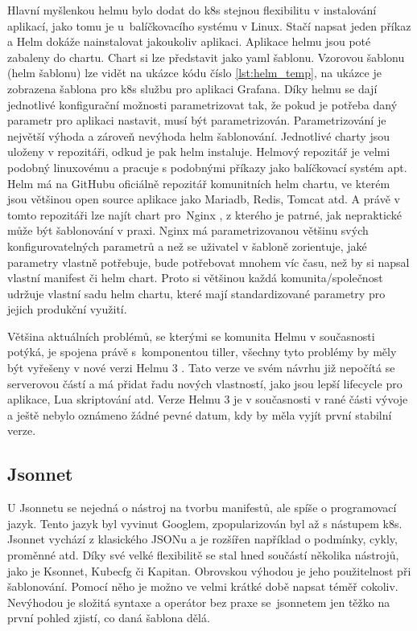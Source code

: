 Hlavní myšlenkou helmu bylo dodat do k8s stejnou flexibilitu v instalování aplikací, jako tomu je u balíčkovacího systému v Linux. Stačí napsat jeden příkaz a Helm dokáže nainstalovat jakoukoliv aplikaci. Aplikace helmu jsou poté zabaleny do chartu. Chart si lze představit jako yaml šablonu. Vzorovou šablonu (helm šablonu) lze vidět na ukázce kódu číslo \ref{lst:helm_temp}, na ukázce je zobrazena šablona pro k8s službu pro aplikaci Grafana. Díky helmu se dají jednotlivé konfigurační možnosti parametrizovat tak, že pokud je potřeba daný parametr pro aplikaci nastavit, musí být parametrizován. Parametrizování je největší výhoda a zároveň nevýhoda helm šablonování. Jednotlivé charty jsou uloženy v repozitáři, odkud je pak helm instaluje. Helmový repozitář je velmi podobný linuxovému a pracuje s podobnými příkazy jako balíčkovací systém apt. Helm má na GitHubu oficiálně repozitář komunitních helm chartu, ve kterém jsou většinou open source aplikace jako Mariadb, Redis, Tomcat atd. A právě v tomto repozitáři lze najít chart pro Nginx \cite{nginx_helm_template}, z kterého je patrné, jak nepraktické může být šablonování v praxi. Nginx má parametrizovanou většinu svých konfigurovatelných parametrů a než se uživatel v šabloně zorientuje, jaké parametry vlastně potřebuje, bude potřebovat mnohem víc času, než by si napsal vlastní manifest či helm chart. Proto si většinou každá komunita/společnost udržuje vlastní sadu helm chartu, které mají standardizované parametry pro jejich produkční využití.

Většina aktuálních problémů, se kterými se komunita Helmu v současnosti potýká, je spojena právě s komponentou tiller, všechny tyto problémy by měly být vyřešeny v nové verzi Helmu 3 \cite{helm_helm3}. Tato verze ve svém návrhu již nepočítá se serverovou částí a má přidat řadu nových vlastností, jako jsou lepší lifecycle pro aplikace, Lua skriptování atd. Verze Helmu 3 je v současnosti v rané části vývoje a ještě nebylo oznámeno žádné pevné datum, kdy by měla vyjít první stabilní verze.

\subsection{Jsonnet}
U Jsonnetu se nejedná o nástroj na tvorbu manifestů, ale spíše o programovací jazyk. Tento jazyk byl vyvinut Googlem, zpopularizován byl až s nástupem k8s. Jsonnet vychází z klasického JSONu a je rozšířen například o podmínky, cykly, proměnné atd. Díky své velké flexibilitě se stal hned součástí několika nástrojů, jako je Ksonnet, Kubecfg či Kapitan. Obrovskou výhodou je jeho použitelnost při šablonování. Pomocí něho je možno ve velmi krátké době napsat téměř cokoliv. Nevýhodou je složitá syntaxe a operátor bez praxe se jsonnetem jen těžko na první pohled zjistí, co daná šablona dělá.

